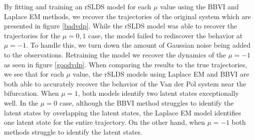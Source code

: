 By fitting and training an rSLDS model for each $\mu$ value using the BBVI and Laplace EM methods, we recover the trajectories of the original system which are presented in figure \ref{badvdp}. While the rSLDS model was able to recover the trajectories for the $\mu=0,1$ case, the model failed to rediscover the behavior at $\mu = -1$. To handle this, we turn down the amount of Gaussian noise being added to the observations. Retraining the model we recover the dynamics of the $\mu = -1$ as seen in figure \ref{goodvdp}. When comparing the results to the true trajectories, we see that for each $\mu$ value, the rSLDS models using Laplace EM and BBVI are both able to accurately recover the behavior of the Van der Pol system near the bifurcation. When $\mu = 1$, both models identify two latent states exceptionally well. In the $\mu = 0$ case, although the BBVI method struggles to identify the latent states by overlapping the latent states, the Laplace EM model identifies one latent state for the entire trajectory. On the other hand, when $\mu = -1$ both methods struggle to identify the latent states.

